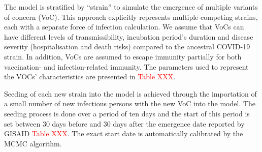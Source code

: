 
The model is stratified by ``strain'' to simulate the emergence of multiple variants of concern (VoC).
This approach explicitly represents multiple competing strains, each with a separate force of infection calculation.
We assume that VoCs can have different levels of transmissibility, incubation period's duration and disease severity 
(hospitalisation and death risks) compared to the ancestral COVID-19 strain. In addition, VoCs are assumed to escape 
immunity partially for both vaccination- and infection-related immunity. The parameters used to represent the VOCs'
characteristics are presented in \textcolor{red}{Table XXX}.

Seeding of each new strain into the model is achieved through the importation of a small number of new infectious persons with the new VoC into the model.
The seeding process is done over a period of ten days and the start of this period is set between 30 days before and 30 days after the emergence date
reported by GISAID \textcolor{red}{Table XXX}. The exact start date is automatically calibrated by the MCMC algorithm.
